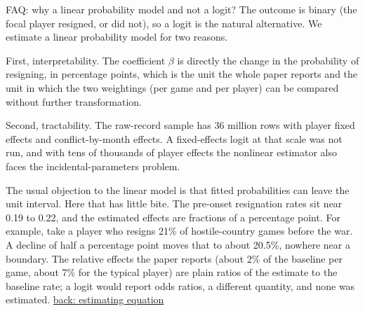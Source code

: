 \documentclass[aspectratio=169,11pt,t]{beamer}
\newcommand{\backto}[2]{\vfill\hfill\hyperlink{#1}{\textcolor{linkblue}{\scriptsize\textsf{back: #2}}}}
\begin{document}
\begin{frame}[label=faq-lpm]{FAQ: why a linear probability model and not a logit?}
  \footnotesize
  The outcome is binary (the focal player resigned, or did not), so a logit is the natural alternative. We estimate a linear probability model for two reasons.

  First, interpretability. The coefficient $\beta$ is directly the change in the probability of resigning, in percentage points, which is the unit the whole paper reports and the unit in which the two weightings (per game and per player) can be compared without further transformation.

  Second, tractability. The raw-record sample has 36 million rows with player fixed effects and conflict-by-month effects. A fixed-effects logit at that scale was not run, and with tens of thousands of player effects the nonlinear estimator also faces the incidental-parameters problem.

  The usual objection to the linear model is that fitted probabilities can leave the unit interval. Here that has little bite. The pre-onset resignation rates sit near 0.19 to 0.22, and the estimated effects are fractions of a percentage point. For example, take a player who resigns 21\% of hostile-country games before the war. A decline of half a percentage point moves that to about 20.5\%, nowhere near a boundary. The relative effects the paper reports (about 2\% of the baseline per game, about 7\% for the typical player) are plain ratios of the estimate to the baseline rate; a logit would report odds ratios, a different quantity, and none was estimated.
  \backto{equation}{estimating equation}
\end{frame}
\end{document}
